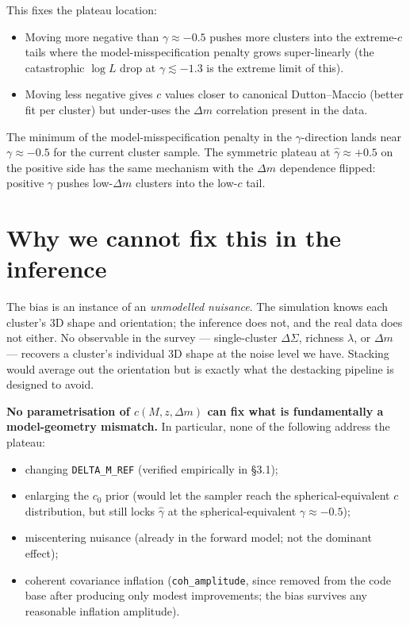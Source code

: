 \documentclass[11pt,a4paper]{article}
\newcommand{\ghat}{\hat\gamma}
\newcommand{\dm}{\Delta m}
\begin{document}
This fixes the plateau location:
\begin{itemize}
\item Moving more negative than $\gamma \approx -0.5$ pushes more clusters into
the extreme-$c$ tails where the model-misspecification penalty grows
super-linearly (the catastrophic $\log L$ drop at $\gamma \lesssim -1.3$ is the
extreme limit of this).
\item Moving less negative gives $c$ values closer to canonical Dutton--Maccio
(better fit per cluster) but under-uses the $\dm$ correlation present in the
data.
\end{itemize}
The minimum of the model-misspecification penalty in the $\gamma$-direction
lands near $\gamma \approx -0.5$ for the current cluster sample.  The symmetric
plateau at $\ghat \approx +0.5$ on the positive side has the same mechanism with
the $\dm$ dependence flipped: positive $\gamma$ pushes low-$\dm$ clusters into
the low-$c$ tail.

\section{Why we cannot fix this in the inference}

The bias is an instance of an \emph{unmodelled nuisance}.  The simulation knows
each cluster's 3D shape and orientation; the inference does not, and the real
data does not either.  No observable in the survey --- single-cluster
$\Delta\Sigma$, richness $\lambda$, or $\dm$ --- recovers a cluster's individual
3D shape at the noise level we have.  Stacking would average out the
orientation but is exactly what the destacking pipeline is designed to avoid.

\textbf{No parametrisation of $c(M,z,\dm)$ can fix what is fundamentally a
model-geometry mismatch.}  In particular, none of the following address the
plateau:

\begin{itemize}
  \item changing \texttt{DELTA\_M\_REF} (verified empirically in \S 3.1);
  \item enlarging the $c_0$ prior (would let the sampler reach the
        spherical-equivalent $c$ distribution, but still locks $\ghat$ at the
        spherical-equivalent $\gamma \approx -0.5$);
  \item miscentering nuisance (already in the forward model; not the dominant
        effect);
  \item coherent covariance inflation (\texttt{coh\_amplitude}, since removed
        from the code base after producing only modest improvements; the bias
        survives any reasonable inflation amplitude).
\end{itemize}
\end{document}
